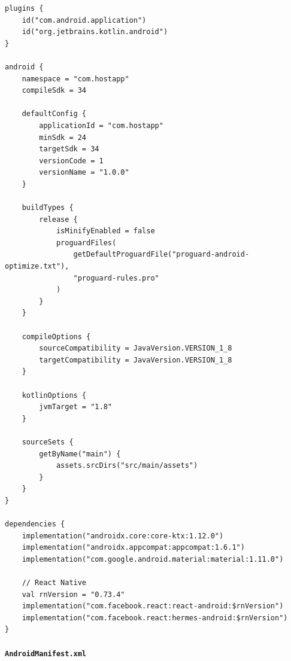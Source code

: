 \documentclass[11pt]{article}
\begin{document}
\begin{verbatim}
plugins {
    id("com.android.application")
    id("org.jetbrains.kotlin.android")
}

android {
    namespace = "com.hostapp"
    compileSdk = 34

    defaultConfig {
        applicationId = "com.hostapp"
        minSdk = 24
        targetSdk = 34
        versionCode = 1
        versionName = "1.0.0"
    }

    buildTypes {
        release {
            isMinifyEnabled = false
            proguardFiles(
                getDefaultProguardFile("proguard-android-optimize.txt"),
                "proguard-rules.pro"
            )
        }
    }

    compileOptions {
        sourceCompatibility = JavaVersion.VERSION_1_8
        targetCompatibility = JavaVersion.VERSION_1_8
    }

    kotlinOptions {
        jvmTarget = "1.8"
    }

    sourceSets {
        getByName("main") {
            assets.srcDirs("src/main/assets")
        }
    }
}

dependencies {
    implementation("androidx.core:core-ktx:1.12.0")
    implementation("androidx.appcompat:appcompat:1.6.1")
    implementation("com.google.android.material:material:1.11.0")

    // React Native
    val rnVersion = "0.73.4"
    implementation("com.facebook.react:react-android:$rnVersion")
    implementation("com.facebook.react:hermes-android:$rnVersion")
}
\end{verbatim}

\paragraph{\texttt{AndroidManifest.xml}}
\end{document}
